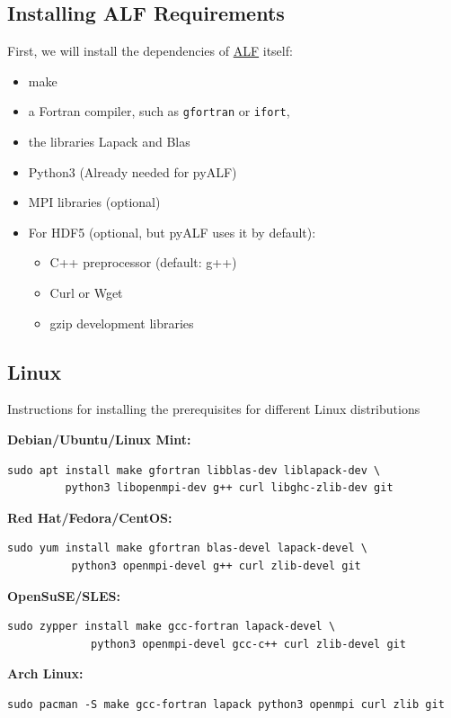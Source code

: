 \documentclass[10pt,modern]{scrartcl}
\numberwithin{exerciseitem}{exercise} %
\begin{document}
\subsection{Installing ALF Requirements}

First, we will install the dependencies of \href{https://git.physik.uni-wuerzburg.de/ALF}{ALF} itself:
\begin{itemize}
   \item make
	\item a Fortran compiler, such as \texttt{gfortran} or \texttt{ifort},
	\item the libraries Lapack and Blas
	\item Python3 (Already needed for pyALF)
	\item MPI libraries (optional)
	\item For HDF5 (optional, but pyALF uses it by default):
	\begin{itemize}
      \item C++ preprocessor (default: g++)
      \item Curl or Wget
      \item gzip development libraries
   \end{itemize}
\end{itemize}


\subsection*{Linux}
Instructions for installing the prerequisites for different Linux distributions

\textbf{Debian/Ubuntu/Linux Mint:}
\begin{lstlisting}[style=bash]
sudo apt install make gfortran libblas-dev liblapack-dev \
         python3 libopenmpi-dev g++ curl libghc-zlib-dev git
\end{lstlisting}

\textbf{Red Hat/Fedora/CentOS:}
\begin{lstlisting}[style=bash]
sudo yum install make gfortran blas-devel lapack-devel \
          python3 openmpi-devel g++ curl zlib-devel git
\end{lstlisting}

\textbf{OpenSuSE/SLES:}
\begin{lstlisting}[style=bash]
sudo zypper install make gcc-fortran lapack-devel \
             python3 openmpi-devel gcc-c++ curl zlib-devel git
\end{lstlisting}

\textbf{Arch Linux:}
\begin{lstlisting}[style=bash]
sudo pacman -S make gcc-fortran lapack python3 openmpi curl zlib git
\end{lstlisting}
\end{document}
